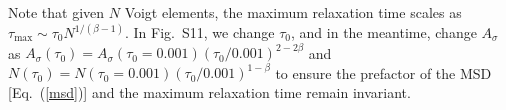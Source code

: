 \documentclass[aps, prl, twocolumn, longbibliography, linenumbers, superscriptaddress]{revtex4-2}
\begin{document}
Note that given $N$ Voigt elements, the maximum relaxation time scales as $\tau_{\max}\sim \tau_0 N^{1/(\beta-1)}$. In Fig.~S11, we change $\tau_0$, and in the meantime, change $A_{\sigma}$ as $A_{\sigma}(\tau_0)=A_{\sigma}(\tau_0=0.001) (\tau_0/0.001)^{2-2\beta}$ and $N(\tau_0)=N(\tau_0=0.001) (\tau_0/0.001)^{1-\beta}$ to ensure the prefactor of the MSD [Eq.~(\ref{msd})] and the maximum relaxation time remain invariant.
\end{document}
